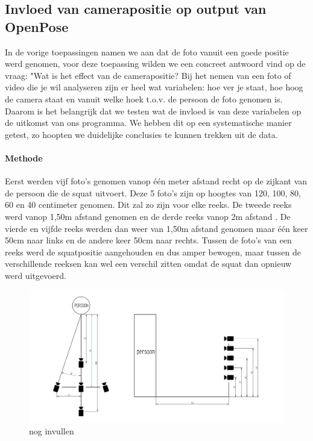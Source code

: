\documentclass[a4paper,twoside,kulak]{kulakreport}
\begin{document}
\subsection{Invloed van camerapositie op output van OpenPose}
In de vorige toepassingen namen we aan dat de foto vanuit een goede positie werd genomen, voor deze toepassing wilden we een concreet antwoord vind op de vraag: "Wat is het effect van de camerapositie? Bij het nemen van een foto of video die je wil analyseren zijn er heel wat variabelen: hoe ver je staat, hoe hoog de camera staat en vanuit welke hoek t.o.v. de persoon de foto genomen is. Daarom is het belangrijk dat we testen wat de invloed is van deze variabelen op de uitkomst van ons programma. We hebben dit op een systematische manier getest, zo hoopten we duidelijke conclusies te kunnen trekken uit de data.
\paragraph{Methode}
Eerst werden vijf foto’s genomen vanop één meter afstand recht op de zijkant van de persoon die de squat uitvoert. Deze 5 foto’s zijn op hoogtes van 120, 100, 80, 60 en 40 centimeter genomen. Dit zal zo zijn voor elke reeks. De tweede reeks werd vanop 1,50m afstand genomen en de derde reeks vanop 2m afstand . De vierde en vijfde reeks werden dan weer van 1,50m afstand genomen maar één keer 50cm naar links en de andere keer 50cm naar rechts. Tussen de foto’s van een reeks werd de squatpositie aangehouden en dus amper bewogen, maar tussen de verschillende reeksen kan wel een verschil zitten omdat de squat dan opnieuw werd uitgevoerd.
\begin{figure}
	\includegraphics[width=\textwidth]{cameraopstelling}
	\caption{nog invullen}
\end{figure}
\end{document}
